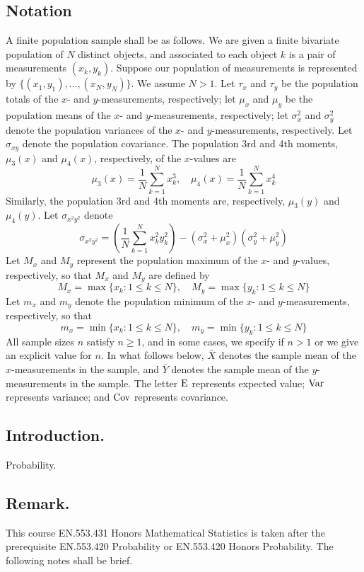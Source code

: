 \documentclass[titlepage]{article}
\begin{document}
\subsection{Notation} A finite population sample shall be as follows. We are given a finite bivariate population of $N$ distinct objects, and associated to each object $k$ is a pair of measurements $(x_k, y_k)$. Suppose our population of measurements is represented by $\{(x_1, y_1), \ldots, (x_N, y_N)\}$. We assume $N > 1$. Let $\tau_x$ and $\tau_y$ be the population totals of the $x$- and $y$-measurements, respectively; let $\mu_x$ and $\mu_y$ be the population means of the $x$- and $y$-measurements, respectively; let $\sigma_x^2$ and $\sigma_y^2$ denote the population variances of the $x$- and $y$-measurements, respectively. Let $\sigma_{xy}$ denote the population covariance.
The population 3rd and 4th moments, $\mu_3(x)$ and $\mu_4(x)$, respectively, of the $x$-values are
$$\mu_3(x) = \frac{1}{N} \sum_{k=1}^{N} x_k^3, \quad \mu_4(x) = \frac{1}{N} \sum_{k=1}^{N} x_k^4$$
Similarly, the population 3rd and 4th moments are, respectively, $\mu_3(y)$ and $\mu_4(y)$.
Let $\sigma_{x^2y^2}$ denote
$$\sigma_{x^2y^2} = \left( \frac{1}{N} \sum_{k=1}^{N} x_k^2 y_k^2 \right) - (\sigma_x^2 + \mu_x^2)(\sigma_y^2 + \mu_y^2)$$
Let $M_x$ and $M_y$ represent the population maximum of the $x$- and $y$-values, respectively, so that $M_x$ and $M_y$ are defined by
$$M_x = \max\{x_k : 1 \leq k \leq N\}, \quad M_y = \max\{y_k : 1 \leq k \leq N\}$$
Let $m_x$ and $m_y$ denote the population minimum of the $x$- and $y$-measurements, respectively, so that
$$m_x = \min\{x_k : 1 \leq k \leq N\}, \quad m_y = \min\{y_k : 1 \leq k \leq N\}$$
All sample sizes $n$ satisfy $n \geq 1$, and in some cases, we specify if $n > 1$ or we give an explicit value for $n$. In what follows below, $\bar{X}$ denotes the sample mean of the $x$-measurements in the sample, and $\bar{Y}$ denotes the sample mean of the $y$-measurements in the sample. The letter $\text{E}$ represents expected value; $\text{Var}$ represents variance; and $\text{Cov}$ represents covariance.

\newpage {}

\subsection{Introduction.} Probability.

\subsection{Remark.} This course EN.553.431 Honors Mathematical Statistics is taken after the prerequisite EN.553.420 Probability or EN.553.420 Honors Probability. The following notes shall be brief.
\end{document}
